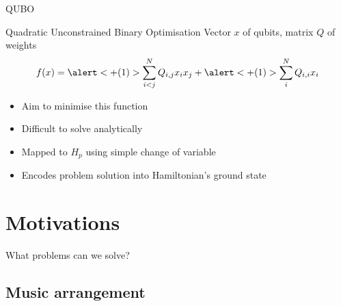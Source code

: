 \documentclass{beamer}
\begin{document}
\begin{frame}{QUBO}
    \pause
    \begin{block}{Quadratic Unconstrained Binary Optimisation}
        \vspace{0.1em}
        Vector $x$ of qubits, matrix $Q$ of weights
        \Large
        \begin{equation*}
            f(x)=\alert<+(1)>{\sum^N_{i<j}Q_{i,j}x_ix_j} + \alert<+(1)>{\sum^N_iQ_{i,i}x_i}
        \end{equation*}
    \end{block}
    \pause
    \begin{itemize}
        \item Aim to minimise this function
        \item Difficult to solve analytically
        \item Mapped to $H_p$ using simple change of variable
        \item Encodes problem solution into Hamiltonian's ground state
    \end{itemize}

\end{frame}

\section{Motivations}

\begin{frame}[standout]
    What problems can we solve?
\end{frame}

\subsection{Music arrangement}
\end{document}
